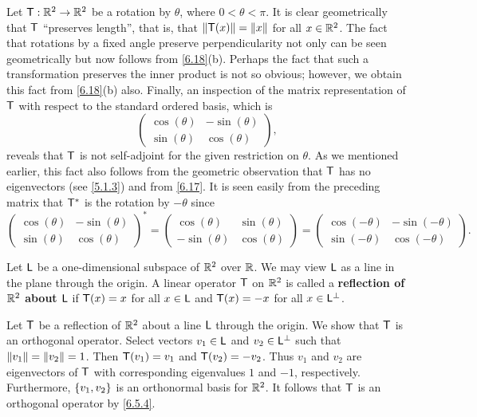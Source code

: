 \begin{eg}\label{6.5.6}
	Let \(\mathsf{T} : \mathbb{R}^2 \to \mathbb{R}^2\) be a rotation by \(\theta\), where \(0 < \theta < \pi\).
	It is clear geometrically that \(\mathsf{T}\) ``preserves length'', that is, that \(\left\lVert\mathsf{T}(x)\right\rVert = \left\lVert x\right\rVert\) for all \(x \in \mathbb{R}^2\).
	The fact that rotations by a fixed angle preserve perpendicularity not only can be seen geometrically but now follows from \cref{6.18}(b).
	Perhaps the fact that such a transformation preserves the inner product is not so obvious;
	however, we obtain this fact from \cref{6.18}(b) also.
	Finally, an inspection of the matrix representation of \(\mathsf{T}\) with respect to the standard ordered basis, which is
	\[
		\begin{pmatrix}
			\cos(\theta) & -\sin(\theta) \\
			\sin(\theta) & \cos(\theta)
		\end{pmatrix},
	\]
	reveals that \(\mathsf{T}\) is not self-adjoint for the given restriction on \(\theta\).
	As we mentioned earlier, this fact also follows from the geometric observation that \(\mathsf{T}\) has no eigenvectors (see \cref{5.1.3}) and from \cref{6.17}.
	It is seen easily from the preceding matrix that \(\mathsf{T}^*\) is the rotation by \(-\theta\) since
	\[
		\begin{pmatrix}
			\cos(\theta) & -\sin(\theta) \\
			\sin(\theta) & \cos(\theta)
		\end{pmatrix}^* = \begin{pmatrix}
			\cos(\theta)  & \sin(\theta) \\
			-\sin(\theta) & \cos(\theta)
		\end{pmatrix} = \begin{pmatrix}
			\cos(-\theta) & -\sin(-\theta) \\
			\sin(-\theta) & \cos(-\theta)
		\end{pmatrix}.
	\]
\end{eg}

\begin{defn}\label{6.5.7}
	Let \(\mathsf{L}\) be a one-dimensional subspace of \(\mathbb{R}^2\) over \(\mathbb{R}\).
	We may view \(\mathsf{L}\) as a line in the plane through the origin.
	A linear operator \(\mathsf{T}\) on \(\mathbb{R}^2\) is called a \textbf{reflection of \(\mathbb{R}^2\) about \(\mathsf{L}\)} if \(\mathsf{T}(x) = x\) for all \(x \in \mathsf{L}\) and \(\mathsf{T}(x) = -x\) for all \(x \in \mathsf{L}^{\perp}\).
\end{defn}

\begin{eg}\label{6.5.8}
	Let \(\mathsf{T}\) be a reflection of \(\mathbb{R}^2\) about a line \(\mathsf{L}\) through the origin.
	We show that \(\mathsf{T}\) is an orthogonal operator.
	Select vectors \(v_1 \in \mathsf{L}\) and \(v_2 \in \mathsf{L}^{\perp}\) such that \(\left\lVert v_1\right\rVert = \left\lVert v_2\right\rVert = 1\).
	Then \(\mathsf{T}(v_1) = v_1\) and \(\mathsf{T}(v_2) = -v_2\).
	Thus \(v_1\) and \(v_2\) are eigenvectors of \(\mathsf{T}\) with corresponding eigenvalues \(1\) and \(-1\), respectively.
	Furthermore, \(\left\lbrace v_1, v_2\right\rbrace\) is an orthonormal basis for \(\mathbb{R}^2\).
	It follows that \(\mathsf{T}\) is an orthogonal operator by \cref{6.5.4}.
\end{eg}

